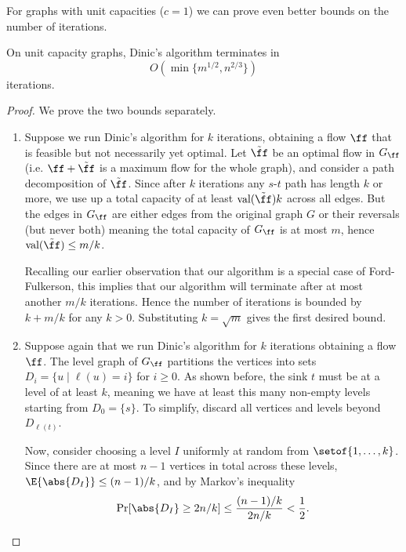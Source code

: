 For graphs with unit capacities ($c = 1$) we can prove even better bounds on the number of iterations.
\begin{theorem}
  On unit capacity graphs, Dinic's algorithm terminates in
  $$O\left(\min\{m^{1/2}, n^{2/3}\}\right)$$ iterations.
\end{theorem}
\begin{proof}
  We prove the two bounds separately.
  \begin{enumerate}
  \item Suppose we run Dinic's algorithm for $k$ iterations, obtaining a flow $\ff$ that is
    feasible but not necessarily yet optimal. Let $\tilde{\ff}$ be an optimal flow in
    $G_{\ff}$ (i.e. $\ff+\tilde{\ff}$ is a maximum flow for the whole graph),
    and consider a path decomposition of $\tilde{\ff}$. Since after $k$ iterations
    any $s$-$t$ path has length $k$ or more, we use up a total capacity of at least
    $\text{val}(\tilde{\ff})k$ across all edges. But the edges in $G_{\ff}$ are either edges
    from the original graph $G$ or their reversals (but never both) meaning the total
    capacity of $G_{\ff}$ is at most $m$, hence $\text{val}(\tilde{\ff}) \leq m/k$.

    Recalling our earlier observation that our algorithm is a special case of
    Ford-Fulkerson, this implies that our algorithm will terminate after at most
    another $m/k$ iterations. Hence the number of iterations is bounded by $k+m/k$ for
    any $k>0$. Substituting $k=\sqrt{m}$ gives the first desired bound.
  \item Suppose again that we run Dinic's algorithm for $k$ iterations obtaining a flow $\ff$.
    The level graph of $G_{\ff}$ partitions the vertices into sets
    $D_i = \{u\mid\ell(u) = i\}$ for $i\geq 0$.
    As shown before, the sink $t$ must be at a level of at
    least $k$, meaning we have at least this many non-empty levels starting from
    $D_0 = \{s\}$. To simplify, discard all vertices and levels beyond $D_{\ell(t)}$.

    Now, consider choosing a level $I$ uniformly at random from
    $\setof{1,\ldots,k}$.
    Since there are at most $n-1$ vertices in total across these levels,
    $\E{\abs{D_I}} \leq (n-1)/k$, and by Markov's inequality
    \[
      \Pr[ \abs{D_I} \geq 2n/k ] \leq
      \frac{(n-1)/k}{2n/k} < \frac{1}{2}
      .
    \]


\end{enumerate}
\end{proof}
